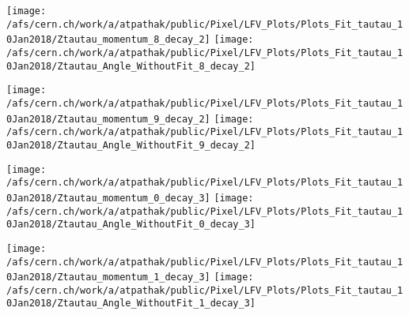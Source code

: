 \documentclass{beamer}
\begin{document}
\begin{frame}
\begin{normalsize}
\begin{center}
\texttt{[image: /afs/cern.ch/work/a/atpathak/public/Pixel/LFV\_Plots/Plots\_Fit\_tautau\_10Jan2018/Ztautau\_momentum\_8\_decay\_2]}
\texttt{[image: /afs/cern.ch/work/a/atpathak/public/Pixel/LFV\_Plots/Plots\_Fit\_tautau\_10Jan2018/Ztautau\_Angle\_WithoutFit\_8\_decay\_2]} 
\end{center}
\end{normalsize}
\end {frame}
\begin{frame}
\begin{normalsize}
\begin{center}
\texttt{[image: /afs/cern.ch/work/a/atpathak/public/Pixel/LFV\_Plots/Plots\_Fit\_tautau\_10Jan2018/Ztautau\_momentum\_9\_decay\_2]}
\texttt{[image: /afs/cern.ch/work/a/atpathak/public/Pixel/LFV\_Plots/Plots\_Fit\_tautau\_10Jan2018/Ztautau\_Angle\_WithoutFit\_9\_decay\_2]} 
\end{center}
\end{normalsize}
\end {frame}
\begin{frame}
\begin{normalsize}
\begin{center}
\texttt{[image: /afs/cern.ch/work/a/atpathak/public/Pixel/LFV\_Plots/Plots\_Fit\_tautau\_10Jan2018/Ztautau\_momentum\_0\_decay\_3]}
\texttt{[image: /afs/cern.ch/work/a/atpathak/public/Pixel/LFV\_Plots/Plots\_Fit\_tautau\_10Jan2018/Ztautau\_Angle\_WithoutFit\_0\_decay\_3]} 
\end{center}
\end{normalsize}
\end {frame}
\begin{frame}
\begin{normalsize}
\begin{center}
\texttt{[image: /afs/cern.ch/work/a/atpathak/public/Pixel/LFV\_Plots/Plots\_Fit\_tautau\_10Jan2018/Ztautau\_momentum\_1\_decay\_3]}
\texttt{[image: /afs/cern.ch/work/a/atpathak/public/Pixel/LFV\_Plots/Plots\_Fit\_tautau\_10Jan2018/Ztautau\_Angle\_WithoutFit\_1\_decay\_3]} 
\end{center}
\end{normalsize}
\end {frame}
\end{document}
